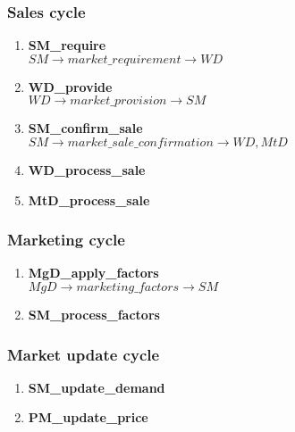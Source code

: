 \documentclass[11pt]{article}
\begin{document}
\subsubsection{Sales cycle}
\begin{enumerate}
	\item \textbf{SM\_require} \\
	$ SM \rightarrow market\_requirement \rightarrow WD $
	\item \textbf{WD\_provide} \\
	$ WD \rightarrow market\_provision \rightarrow SM $
	\item \textbf{SM\_confirm\_sale} \\
	$ SM \rightarrow market\_sale\_confirmation \rightarrow WD, MtD $
	\item \textbf{WD\_process\_sale}
	\item \textbf{MtD\_process\_sale}
\end{enumerate}

\subsubsection{Marketing cycle}
\begin{enumerate}
	\item \textbf{MgD\_apply\_factors} \\
	$ MgD \rightarrow marketing\_factors \rightarrow SM $
	\item \textbf{SM\_process\_factors}
\end{enumerate}

\subsubsection{Market update cycle}
\begin{enumerate}
	\item \textbf{SM\_update\_demand}
	\item \textbf{PM\_update\_price}
\end{enumerate}
\end{document}
